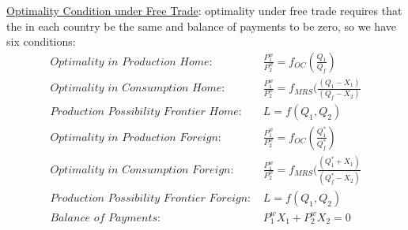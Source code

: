 \documentclass{article}
\begin{document}
\underline{Optimality Condition under Free Trade}: optimality under free trade requires that the  in each country be the same and balance of payments to be zero, so we have six conditions:
\begin{align*}
  \textit{Optimality in Production Home: }& \tfrac{P_{1}^{w}}{P_{2}^{w}} = f_{OC}(\tfrac{Q_{1}}{Q_{f}}) \\
  \textit{Optimality in Consumption Home: }& \tfrac{P_{1}^{w}}{P_{2}^{w}} = f_{MRS}(\tfrac{(Q_{1}-X_{1})}{(Q_{f}-X_{2})} \\
  \textit{Production Possibility Frontier Home: }& L = f(Q_{1}, Q_{2}) \\
  \textit{Optimality in Production Foreign: }& \tfrac{P_{1}^{w}}{P_{2}^{w}} = f_{OC}(\tfrac{Q_{1}^{*}}{Q_{f}^{*}}) \\
  \textit{Optimality in Consumption Foreign: }& \tfrac{P_{1}^{w}}{P_{2}^{w}} = f_{MRS}(\tfrac{(Q_{1}^{*}+X_{1})}{(Q_{f}^{*}-X_{2})} \\
  \textit{Production Possibility Frontier Foreign: }& L = f(Q_{1}, Q_{2}) \\
  \textit{Balance of Payments: }& P_{1}^{w}X_{1} + P_{2}^{w}X_{2} = 0
\end{align*}
\end{document}
